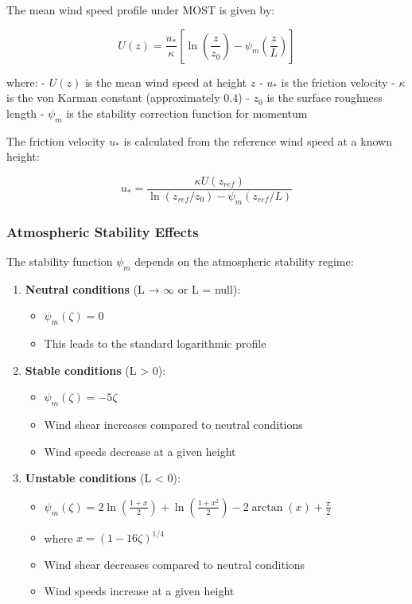 \documentclass[
]{article}
\providecommand{\tightlist}{%
  \setlength{\itemsep}{0pt}\setlength{\parskip}{0pt}}
\begin{document}
The mean wind speed profile under MOST is given by:

\[U(z) = \frac{u_*}{\kappa} \left[ \ln\left(\frac{z}{z_0}\right) - \psi_m\left(\frac{z}{L}\right) \right]\]

where: - \(U(z)\) is the mean wind speed at height \(z\) - \(u_*\) is
the friction velocity - \(\kappa\) is the von Karman constant
(approximately 0.4) - \(z_0\) is the surface roughness length -
\(\psi_m\) is the stability correction function for momentum

The friction velocity \(u_*\) is calculated from the reference wind
speed at a known height:

\[u_* = \frac{\kappa U(z_{ref})}{\ln(z_{ref}/z_0) - \psi_m(z_{ref}/L)}\]

\hypertarget{atmospheric-stability-effects}{%
\subsubsection{Atmospheric Stability
Effects}\label{atmospheric-stability-effects}}

The stability function \(\psi_m\) depends on the atmospheric stability
regime:

\begin{enumerate}
\def\labelenumi{\arabic{enumi}.}
\tightlist
\item
  \textbf{Neutral conditions} (L → \(\infty\) or L = null):

  \begin{itemize}
  \tightlist
  \item
    \(\psi_m(\zeta) = 0\)
  \item
    This leads to the standard logarithmic profile
  \end{itemize}
\item
  \textbf{Stable conditions} (L \textgreater{} 0):

  \begin{itemize}
  \tightlist
  \item
    \(\psi_m(\zeta) = -5\zeta\)
  \item
    Wind shear increases compared to neutral conditions
  \item
    Wind speeds decrease at a given height
  \end{itemize}
\item
  \textbf{Unstable conditions} (L \textless{} 0):

  \begin{itemize}
  \tightlist
  \item
    \(\psi_m(\zeta) = 2\ln\left(\frac{1+x}{2}\right) + \ln\left(\frac{1+x^2}{2}\right) - 2\arctan(x) + \frac{\pi}{2}\)
  \item
    where \(x = (1-16\zeta)^{1/4}\)
  \item
    Wind shear decreases compared to neutral conditions
  \item
    Wind speeds increase at a given height
  \end{itemize}
\end{enumerate}
\end{document}
